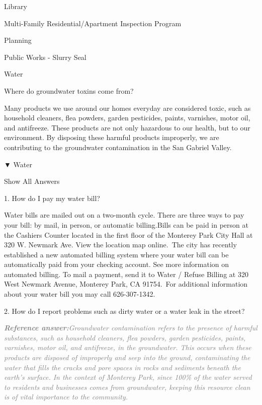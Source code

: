 \documentclass[a4paper,11pt]{article}
\begin{document}
\begin{docenv}
{Library

Multi-Family Residential/Apartment Inspection Program

Planning

Public Works - Slurry Seal

Water

 

Where do groundwater toxins come from?	

Many products we use around our homes everyday are considered toxic, such as household cleaners, flea powders, garden pesticides, paints, varnishes, motor oil, and antifreeze. These products are not only hazardous to our health, but to our environment. By disposing these harmful products improperly, we are contributing to the groundwater contamination in the San Gabriel Valley.	

▼
Water	

Show All Answers

1.
How do I pay my water bill?

Water bills are mailed out on a two-month cycle. There are three ways to pay your bill: by mail, in person, or automatic billing.Bills can be paid in person at the Cashiers Counter located in the first floor of the Monterey Park City Hall at 320 W. Newmark Ave. View the location map online. The city has recently established a new automated billing system where your water bill can be automatically paid from your checking account. See more information on automated billing. To mail a payment, send it to Water / Refuse Billing at 320 West Newmark Avenue, Monterey Park, CA 91754. For additional information about your water bill you may call 626-307-1342. 

2.
How do I report problems such as dirty water or a water leak in the street?}
\end{docenv}
\begin{refanswerenv}
{\footnotesize\textit{\textcolor{gray}{\textbf{Reference answer:}\enspace Groundwater contamination refers to the presence of harmful substances, such as household cleaners, flea powders, garden pesticides, paints, varnishes, motor oil, and antifreeze, in the groundwater. This occurs when these products are disposed of improperly and seep into the ground, contaminating the water that fills the cracks and pore spaces in rocks and sediments beneath the earth's surface. In the context of Monterey Park, since 100\% of the water served to residents and businesses comes from groundwater, keeping this resource clean is of vital importance to the community.}}}
\end{refanswerenv}
\end{document}
